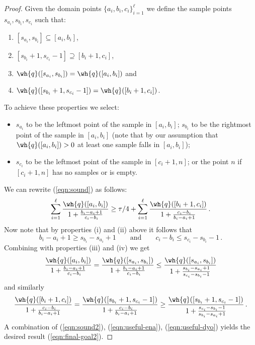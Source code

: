 \begin{proof}
{{Given the domain points $\{a_i, b_i, c_i\}_{i=1}^{\ell}$ we define the sample points $s_{a_i}, s_{b_i}, s_{c_i}$ such that:
\begin{enumerate}
\item[(i)] $[s_{a_i}, s_{b_i}] \subseteq [a_i, b_i]$, 
\item[(ii)] $[s_{b_i}+1, s_{c_i}-1] \supseteq [b_i+1, c_i]$, 
\item[(iii)] $\wh{q}([s_{a_i}, s_{b_i}]) =  \wh{q}([a_i, b_i])$ and 
\item[(iv)] $\wh{q}([s_{b_i}+1, s_{c_i}-1]) =  \wh{q}([b_i+1, c_i])$.
\end{enumerate}
To achieve these properties we select:
\begin{itemize}
\item $s_{a_i}$ to be the leftmost point of the sample in $[a_i,
  b_i]$; $s_{b_i}$ to be the rightmost point of the sample in
%
%
%
 $[a_i, b_i]$ (note that by our assumption that $\wh{q}([a_i, b_i])>0$ at least one sample falls in $[a_i, b_i]$); 
%
\item $s_{c_i}$ to be the leftmost point of the sample in $[c_i+1, n]$; or the point $n$ if $[c_i+1, n]$ has no samples or is empty.
\end{itemize}
We can rewrite (\ref{eqn:sound}) as follows:
\begin{equation} \label{eqn:sound2}
\sum_{i=1}^{\ell} \frac{\wh{q}([a_i, b_i])}{1+ \frac{b_i-a_i+1}{c_i-b_i}} \ge \tau/4 + \sum_{i=1}^{\ell} \frac{\wh{q}([b_i+1, c_i])}{1+ \frac{c_i-b_i}{b_i-a_i+1}}\,.
\end{equation}
Now note that by properties (i) and (ii) above it follows that
\[
b_i-a_i+1\ge s_{b_i} - s_{a_i}+1\qquad\text{and}\qquad
c_i-b_i \le s_{c_i} - s_{b_i}-1\,.
\]
Combining with properties
(iii) and (iv) we get 
\begin{equation} \label{eqn:useful-ena}
\frac{\wh{q}([a_i, b_i])}{1+ \frac{b_i-a_i+1}{c_i-b_i}} = \frac{\wh{q}([s_{a_i}, s_{b_i}])}{1+ \frac{b_i-a_i+1}{c_i-b_i}} \le  
\frac{\wh{q}([s_{a_i}, s_{b_i}])}{1+ \frac{s_{b_i}-s_{a_i}+1}{s_{c_i}-s_{b_i}-1}}
\end{equation}
and similarly
\begin{equation} \label{eqn:useful-dyo}
\frac{\wh{q}([b_i+1, c_i])}{1+ \frac{c_i-b_i}{b_i-a_i+1}} = \frac{\wh{q}([s_{b_i}+1, s_{c_i}-1])}{1+ \frac{c_i-b_i}{b_i-a_i+1}} \ge  
\frac{\wh{q}([s_{b_i}+1, s_{c_i}-1])}{1+ \frac{s_{c_i}-s_{b_i}-1}{s_{b_i}-s_{a_i}+1}}\,.
\end{equation}
A combination of (\ref{eqn:sound2}), (\ref{eqn:useful-ena}), (\ref{eqn:useful-dyo}) yields the
desired result (\ref{eqn:final-goal2}).  


}}
\end{proof}
